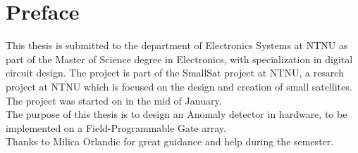 \newpage
\chapter*{Preface}




This thesis is submitted to the department of Electronics Systems at NTNU as part of the Master of Science degree in Electronics, with specialization in digital circuit design. The project is part of the SmallSat project at NTNU, a resarch project at NTNU which is focused on the design and creation of small satellites. The project was started on in the mid of January. 
\\

The purpose of this thesis is to design an Anomaly detector in hardware, to be implemented on a Field-Programmable Gate array. 
\\


Thanks to Milica Orlandic for great guidance and help during the semester.


